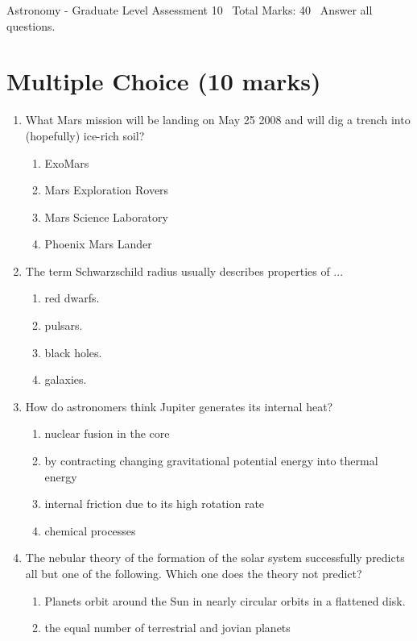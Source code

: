 \documentclass[12pt]{article}
\begin{document}
\begin{center}
Astronomy - Graduate Level Assessment 10 \
Total Marks: 40 \
Answer all questions.
\end{center}

\section*{Multiple Choice (10 marks)}
\begin{enumerate}[label=\arabic*.]
\item What Mars mission will be landing on May 25 2008 and will dig a trench into (hopefully) ice-rich soil?
\begin{enumerate}[label=(\alph*)]
    \item ExoMars
    \item Mars Exploration Rovers
    \item Mars Science Laboratory
    \item Phoenix Mars Lander
\end{enumerate}
\item The term Schwarzschild radius usually describes properties of ...
\begin{enumerate}[label=(\alph*)]
    \item red dwarfs.
    \item pulsars.
    \item black holes.
    \item galaxies.
\end{enumerate}
\item How do astronomers think Jupiter generates its internal heat?
\begin{enumerate}[label=(\alph*)]
    \item nuclear fusion in the core
    \item by contracting changing gravitational potential energy into thermal energy
    \item internal friction due to its high rotation rate
    \item chemical processes
\end{enumerate}
\item The nebular theory of the formation of the solar system successfully predicts all but one of the following. Which one does the theory not predict?
\begin{enumerate}[label=(\alph*)]
    \item Planets orbit around the Sun in nearly circular orbits in a flattened disk.
    \item the equal number of terrestrial and jovian planets

\end{enumerate}
\end{enumerate}
\end{document}
